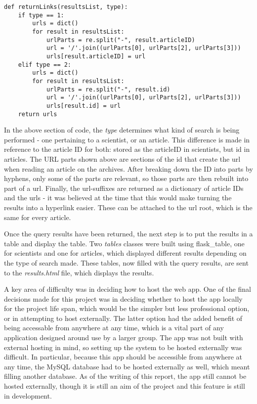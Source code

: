 \documentclass[11pt,a4paper]{book}
\begin{document}
\begin{lstlisting}[caption={Building URLs}]
	def returnLinks(resultsList, type):
	if type == 1:
		urls = dict()
		for result in resultsList:
			urlParts = re.split("-", result.articleID)
			url = '/'.join((urlParts[0], urlParts[2], urlParts[3]))
			urls[result.articleID] = url
	elif type == 2:
		urls = dict()
		for result in resultsList:
			urlParts = re.split("-", result.id)
			url = '/'.join((urlParts[0], urlParts[2], urlParts[3]))
			urls[result.id] = url
	return urls
\end{lstlisting}
In the above section of code, the \textit{type} determines what kind of search is being performed - one pertaining to a scientist, or an article. This difference is made in reference to the article ID for both: stored as the articleID in scientists, but id in articles. The URL parts shown above are sections of the id that create the url when reading an article on the archives. After breaking down the ID into parts by hyphens, only some of the parts are relevant, so those parts are then rebuilt into part of a url. Finally, the url-suffixes are returned as a dictionary of article IDs and the urls - it was believed at the time that this would make turning the results into a hyperlink easier. These can be attached to the url root, which is the same for every article.

Once the query results have been returned, the next step is to put the results in a table and display the table. Two \textit{tables} classes were built using flask\_table, one for scientists and one for articles, which displayed different results depending on the 
type of search made. These tables, now filled with the query results, are sent to the \textit{results.html} file, which displays the results. 

A key area of difficulty was in deciding how to host the web app. One of the final decisions made for this project was in deciding whether to host the app locally for the project life span, which would be the simpler but less professional option, or in attempting to host externally. The latter option had the added benefit of  being accessable from anywhere at any time, which is a vital part of any application designed around use by a larger group. The app was not built with external hosting in mind, so setting up the system to be hosted externally was difficult. In particular, because this app should be accessible from anywhere at any time, the MySQL database had to be hosted externally as well, which meant filling another database. As of the writing of this report, the app still cannot be hosted externally, though it is still an aim of the project and this feature is still in development. 
\end{document}
